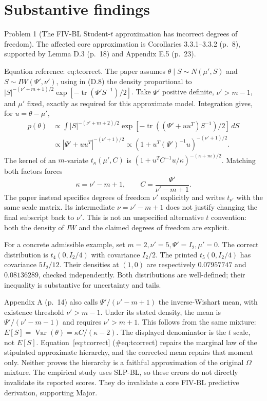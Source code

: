 \documentclass[10pt]{article}
\begin{document}
\section*{Substantive findings}
Problem 1 (The FIV-BL Student-\(t\) approximation has incorrect degrees of freedom).  The affected core approximation is Corollaries 3.3.1–3.3.2 (p. 8), supported by Lemma D.3 (p. 18) and Appendix E.5 (p. 23).\par
Equation reference: eq:tcorrect. The paper assumes \(\theta\mid S\sim N(\mu',S)\) and \(S\sim IW(\Psi',\nu')\), using in (D.8) the density proportional to \(|S|^{-(\nu'+m+1)/2}\exp[-\operatorname{tr}(\Psi'S^{-1})/2]\). Take \(\Psi'\) positive definite, \(\nu'>m-1\), and \(\mu'\) fixed, exactly as required for this approximate model. Integration gives, for \(u=\theta-\mu'\), \[\begin{aligned}
 p(\theta)&\propto\int |S|^{-(\nu'+m+2)/2}
 \exp[-\operatorname{tr}((\Psi'+uu^T)S^{-1})/2]\,dS\\
 &\propto|\Psi'+uu^T|^{-(\nu'+1)/2}
 \propto(1+u^T(\Psi')^{-1}u)^{-(\nu'+1)/2}.\end{aligned}\] The kernel of an \(m\)-variate \(t_\kappa(\mu',C)\) is \((1+u^TC^{-1}u/\kappa)^{-(\kappa+m)/2}\). Matching both factors forces \[
 \kappa=\nu'-m+1,\qquad C=\frac{\Psi'}{\nu'-m+1}.\] The paper instead specifies degrees of freedom \(\nu'\) explicitly and writes \(t_{\nu'}\) with the same scale matrix. Its intermediate \(\nu=\nu'-m+1\) does not justify changing the final subscript back to \(\nu'\). This is not an unspecified alternative \(t\) convention: both the density of \(IW\) and the claimed degrees of freedom are explicit.\par
For a concrete admissible example, set \(m=2,\nu'=5,\Psi'=I_2,\mu'=0\). The correct distribution is \(t_4(0,I_2/4)\) with covariance \(I_2/2\). The printed \(t_5(0,I_2/4)\) has covariance \(5I_2/12\). Their densities at \((1,0)\) are respectively \(0.07957747\) and \(0.08136289\), checked independently. Both distributions are well-defined; their inequality is substantive for uncertainty and tails.\par
Appendix A (p. 14) also calls \(\Psi'/(\nu'-m+1)\) the inverse-Wishart mean, with existence threshold \(\nu'>m-1\). Under its stated density, the mean is \(\Psi'/(\nu'-m-1)\) and requires \(\nu'>m+1\). This follows from the same mixture: \(E[S]=\operatorname{Var}(\theta)
=\kappa C/(\kappa-2)\). The displayed denominator is the \(t\) scale, not \(E[S]\). Equation [eq:tcorrect] (\#eq:tcorrect) repairs the marginal law of the stipulated approximate hierarchy, and the corrected mean repairs that moment only. Neither proves the hierarchy is a faithful approximation of the original \(\Omega\) mixture. The empirical study uses SLP-BL, so these errors do not directly invalidate its reported scores. They do invalidate a core FIV-BL predictive derivation, supporting Major.\par
\end{document}
